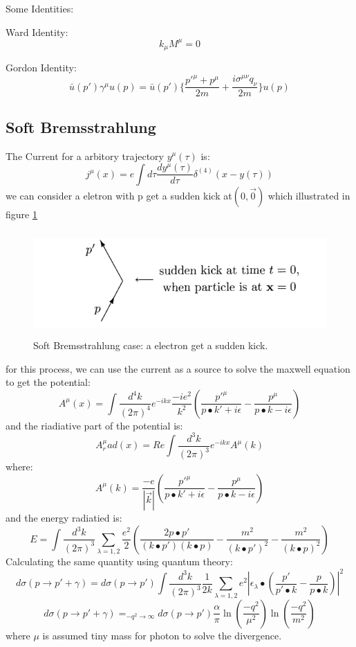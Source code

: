 \noindent Some Identities:\par
Ward Identity:
\[k_\mu M^{\mu}=0\]\par
Gordon Identity:
\[\bar{u}(p')\gamma^\mu u(p)=\bar{u}(p')\{\frac{p'^\mu+p^\mu}{2m}+\frac{i\sigma^{\mu\nu}q_\nu}{2m}\}u(p)\]
\subsection{Soft Bremsstrahlung}
The Current for a arbitory trajectory $y^\mu(\tau)$ is:
\[j^\mu(x)=e\int d\tau \frac{dy^\mu(\tau)}{d\tau}\delta^(4)(x-y(\tau))\]
we can consider a eletron with p get a sudden kick at$ (0,\vec{0})$ which illustrated in figure \ref{fig:soft}
\begin{figure}
\begin{center}
\includegraphics[height=4cm]{./figures/soft}
\caption{Soft Bremsstrahlung case: a electron get a sudden kick.}
\label{fig:soft}
\end{center}
\end{figure}
for this process, we can use the current as a source to solve the maxwell equation to get the potential:
\[A^{\mu}(x)=\int \frac{d^4k}{(2\pi)^4}e^{-ikx}\frac{-ie^2}{k^2}(\frac{p'^\mu}{p\bullet k'+i\epsilon}-\frac{p^\mu}{p\bullet k-i\epsilon})\]
and the riadiative part of the potential is:
\[A^\mu_rad(x)=Re\int \frac{d^3k}{(2\pi)^3}e^{-ikx}A^\mu(k)\]
where:
\[A^\mu(k)=\frac{-e}{|\vec{k}|}(\frac{p'^\mu}{p\bullet k'+i\epsilon}-\frac{p^\mu}{p\bullet k-i\epsilon})\]
and the energy radiatied is:
\[E=\int \frac{d^3k}{(2\pi)^3}\sum_{\lambda=1,2}\frac{e^2}{2}(\frac{2p\bullet p'}{(k\bullet p')(k\bullet p)}-\frac{m^2}{(k\bullet p')^2}-\frac{m^2}{(k\bullet p)^2})\]
Calculating the same quantity using quantum theory:
\[d\sigma(p\rightarrow p'+\gamma)=d\sigma(p\rightarrow p')\int \frac{d^3k}{(2\pi)^3}\frac{1}{2k}\sum_{\lambda=1,2}e^2|\epsilon_\lambda\bullet(\frac{p'}{p'\bullet k}-\frac{p}{p\bullet k})|^2\]
\[d\sigma(p\rightarrow p'+\gamma)=_{-q^2\rightarrow \infty}d\sigma(p\rightarrow p')\frac{\alpha}{\pi}\ln(\frac{-q^2}{\mu^2})\ln(\frac{-q^2}{m^2})\]
where $\mu$ is assumed tiny mass for photon to solve the divergence.\par
